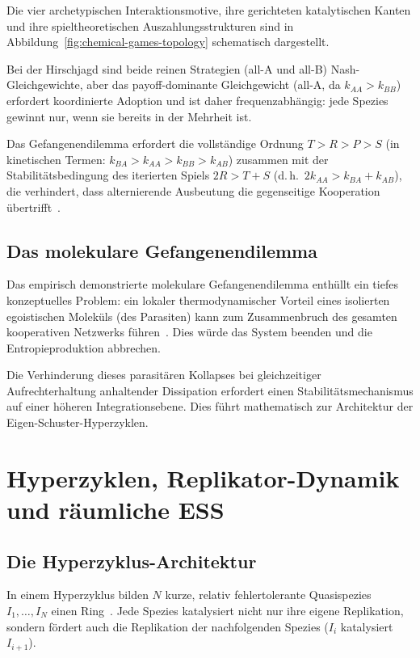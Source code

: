\documentclass[12pt,a4paper]{article}
\theoremstyle{remark}
\begin{document}
Die vier archetypischen Interaktionsmotive, ihre gerichteten katalytischen Kanten und ihre spieltheoretischen Auszahlungsstrukturen sind in Abbildung~\ref{fig:chemical-games-topology} schematisch dargestellt.

\noindent
Bei der Hirschjagd sind beide reinen Strategien (all-A und all-B) Nash-Gleichgewichte, aber das payoff-dominante Gleichgewicht (all-A, da $k_{AA} > k_{BB}$) erfordert koordinierte Adoption und ist daher frequenzabhängig: jede Spezies gewinnt nur, wenn sie bereits in der Mehrheit ist.

Das Gefangenendilemma erfordert die vollständige Ordnung $T > R > P > S$ (in kinetischen Termen: $k_{BA} > k_{AA} > k_{BB} > k_{AB}$) zusammen mit der Stabilitätsbedingung des iterierten Spiels $2R > T + S$ (d.\,h.\ $2k_{AA} > k_{BA} + k_{AB}$), die verhindert, dass alternierende Ausbeutung die gegenseitige Kooperation übertrifft~\citep{HofbauerSigmund1998}.

\subsection{Das molekulare Gefangenendilemma}

Das empirisch demonstrierte molekulare Gefangenendilemma enthüllt ein tiefes konzeptuelles Problem: ein lokaler thermodynamischer Vorteil eines isolierten egoistischen Moleküls (des Parasiten) kann zum Zusammenbruch des gesamten kooperativen Netzwerks führen~\citep{AzoarcusPMC}. Dies würde das System beenden und die Entropieproduktion abbrechen.

Die Verhinderung dieses parasitären Kollapses bei gleichzeitiger Aufrechterhaltung anhaltender Dissipation erfordert einen Stabilitätsmechanismus auf einer höheren Integrationsebene. Dies führt mathematisch zur Architektur der Eigen-Schuster-Hyperzyklen.

\section{Hyperzyklen, Replikator-Dynamik und räumliche ESS}
\label{sec:hypercycles}

\subsection{Die Hyperzyklus-Architektur}

In einem Hyperzyklus bilden $N$ kurze, relativ fehlertolerante Quasispezies $I_1, \ldots, I_N$ einen Ring~\citep{Eigen1979}. Jede Spezies katalysiert nicht nur ihre eigene Replikation, sondern fördert auch die Replikation der nachfolgenden Spezies ($I_i$ katalysiert $I_{i+1}$).
\end{document}
